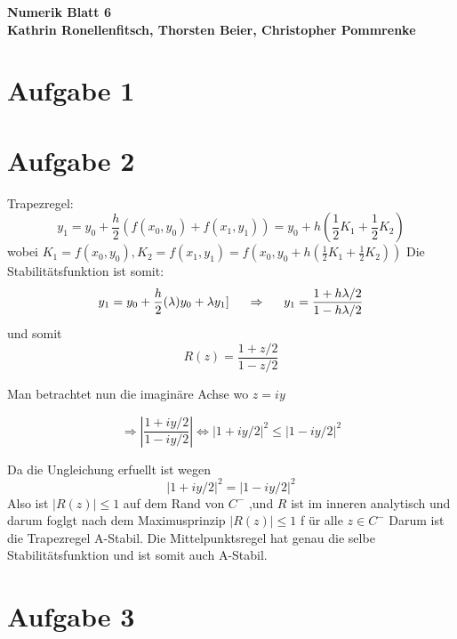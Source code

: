 \documentclass[10pt,oneside,a4paper]{scrartcl}
\begin{document}
    \begin{center}
        \huge %
        \bfseries %
        \sffamily %
        Numerik Blatt 6\\[1em]
        \normalsize
        Kathrin Ronellenfitsch, Thorsten Beier, Christopher Pommrenke
    \end{center}

    
    \section*{Aufgabe 1}

    
    \section*{Aufgabe 2}
    Trapezregel:
    \[
        y_1=y_0 + \frac{h}{2}
        (f(x_0,y_0)+f(x_1,y_1))
        =y_0 + h(\frac{1}{2}K_1+\frac{1}{2}K_2)
    \]
    wobei
    $K_1=f(x_0,y_0),K_2=f(x_1,y_1)=f(x_0,y_0+h(\frac{1}{2}K_1+\frac{1}{2}K_2))$
    \newline
    Die Stabilit\"atsfunktion ist somit:
    \[
        y_1=y_0 + \frac{h}{2}
        (\lambda)y_0+\lambda y_1] \hspace{0.5cm} \Rightarrow \hspace{0.5cm}
        y_1=\frac{1+h \lambda/2}{1-h \lambda/2}
    \]
    und somit
    \[
        R(z)=\frac{1+z/2}{1-z/2}
    \]

    Man betrachtet nun die imagin\"are Achse wo $z=iy$

    \[
        \Rightarrow |\frac{1+iy/2}{1-iy/2}| \Longleftrightarrow |1+ iy/2|^2 \leq
        |1- iy/2|^2
    \]

    Da die Ungleichung erfuellt ist wegen
    \[
        |1+ iy/2|^2=|1 - iy/2|^2
    \] 
    Also ist $|R(z)|\leq 1$ auf dem Rand von $C^-$ ,und $R$ ist im inneren
    analytisch und darum foglgt nach dem Maximusprinzip $|R(z)|\leq 1$ f \"ur
    alle $z \in C^-$ Darum ist die  Trapezregel A-Stabil.
    Die Mittelpunktsregel hat genau die selbe Stabilit\"atsfunktion und ist
    somit auch A-Stabil.
    
    \section*{Aufgabe 3}
\end{document}
